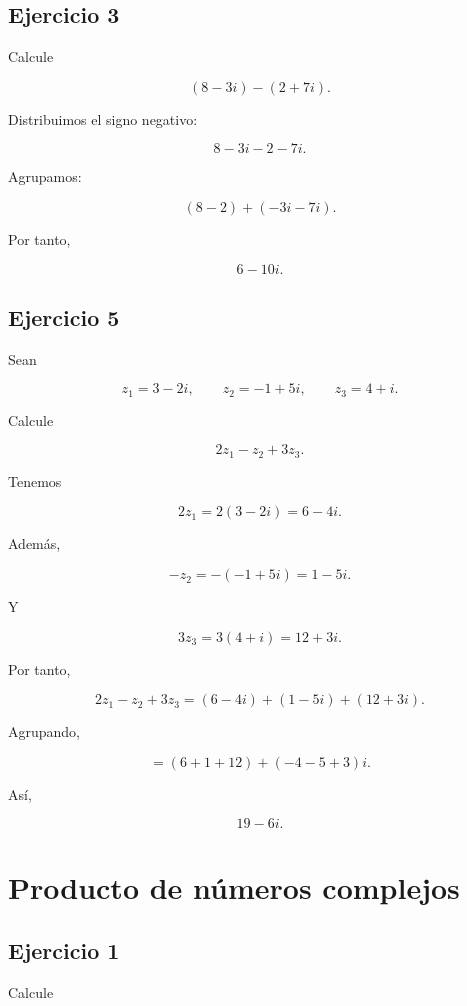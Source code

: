 \documentclass[12pt]{article}
\begin{document}
\subsection*{Ejercicio 3}

Calcule

\[
(8-3i)-(2+7i).
\]

Distribuimos el signo negativo:

\[
8-3i-2-7i.
\]

Agrupamos:

\[
(8-2)+(-3i-7i).
\]

Por tanto,

\[
\boxed{6-10i}.
\]


\subsection*{Ejercicio 5}

Sean

\[
z_1=3-2i,
\qquad
z_2=-1+5i,
\qquad
z_3=4+i.
\]

Calcule

\[
2z_1-z_2+3z_3.
\]

Tenemos

\[
2z_1=2(3-2i)=6-4i.
\]

Además,

\[
-z_2=-(-1+5i)=1-5i.
\]

Y

\[
3z_3=3(4+i)=12+3i.
\]

Por tanto,

\[
2z_1-z_2+3z_3
=
(6-4i)+(1-5i)+(12+3i).
\]

Agrupando,

\[
=(6+1+12)+(-4-5+3)i.
\]

Así,

\[
\boxed{19-6i}.
\]

\section*{Producto de números complejos}

\subsection*{Ejercicio 1}

Calcule
\end{document}
